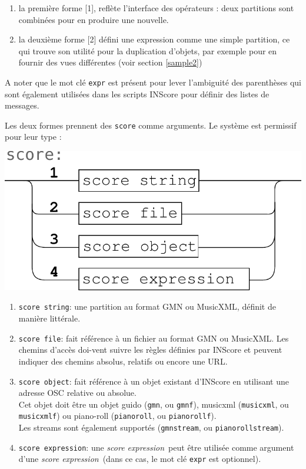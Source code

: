 \documentclass{article}
\newcommand{\OSC}[1]{\texttt{#1}}
\newcommand{\sExpr}{\emph{score expression}}
\begin{document}
\begin{enumerate}
\item la première forme [1], reflète l'interface des opérateurs : deux partitions sont combinées pour en produire une nouvelle.
\item la deuxième forme [2] défini une expression comme une simple partition, ce qui trouve son utilité pour la duplication d'objets, par exemple pour en fournir des vues différentes (voir section \ref{sample2})
\end{enumerate}

A noter que le mot clé \OSC{expr} est présent pour lever l'ambiguité des parenthèses qui sont également utilisées dans les scripts INScore pour définir des listes de messages.

Les deux formes prennent des \OSC{score} comme arguments. Le système est permissif pour leur type :
\begin{center}
\includegraphics[width=0.7\columnwidth]{imgs/syntax2}
\end{center}

\begin{enumerate}
\item \OSC{score string}: une partition au format GMN ou MusicXML, définit de manière littérale.
\item \OSC{score file}:  fait référence à un fichier au format GMN ou MusicXML. Les chemins d'accès doi-vent suivre les règles définies par INScore et peuvent indiquer des chemins absolus, relatifs ou encore une URL.
\item \OSC{score object}:  fait référence à un objet existant d'INScore en utilisant une adresse OSC relative ou absolue.\\ Cet objet doit être un objet guido (\OSC{gmn}, ou \OSC{gmnf}), musicxml (\OSC{musicxml}, ou \OSC{musicxmlf}) ou piano-roll (\OSC{pianoroll}, ou \OSC{pianorollf}). \\
Les streams sont également supportés (\OSC{gmnstream}, ou \OSC{pianorollstream}).
\item \OSC{score expression}:  une \sExpr\ peut être utilisée comme argument d'une \sExpr\ (dans ce cas, le mot clé \OSC{expr} est optionnel).
\end{enumerate}
\end{document}
